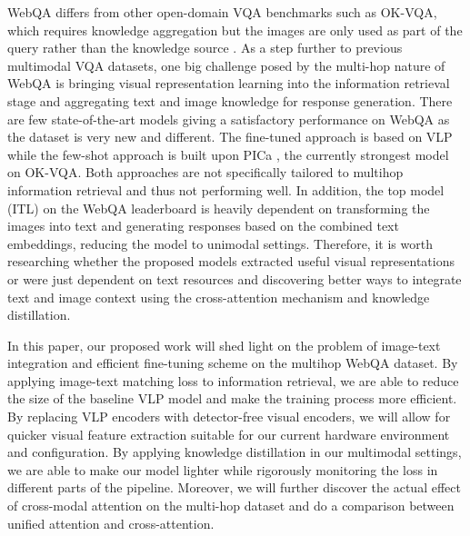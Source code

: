 \documentclass[nohyperref]{article}
\theoremstyle{plain}
\theoremstyle{definition}
\theoremstyle{remark}
\begin{document}
WebQA differs from other open-domain VQA benchmarks such as OK-VQA, which requires knowledge aggregation but the images are only used as part of the query rather than the knowledge source \citep{okvqa}. As a step further to previous multimodal VQA datasets, one big challenge posed by the multi-hop nature of WebQA is bringing visual representation learning into the information retrieval stage and aggregating text and image knowledge for response generation. There are few state-of-the-art models giving a satisfactory performance on WebQA as the dataset is very new and different. The fine-tuned approach is based on VLP while the few-shot approach is built upon PICa \citep{PICa}, the currently strongest model on OK-VQA. Both approaches are not specifically tailored to multihop information retrieval and thus not performing well. In addition, the top model (ITL) on the WebQA leaderboard is heavily dependent on transforming the images into text and generating responses based on the combined text embeddings, reducing the model to unimodal settings. Therefore, it is worth researching whether the proposed models extracted useful visual representations or were just dependent on text resources and discovering better ways to integrate text and image context using the cross-attention mechanism and knowledge distillation. 

In this paper, our proposed work will shed light on the problem of image-text integration and efficient fine-tuning scheme on the multihop WebQA dataset. By applying image-text matching loss to information retrieval, we are able to reduce the size of the baseline VLP model and make the training process more efficient. By replacing VLP encoders with detector-free visual  encoders, we will allow for quicker visual feature extraction suitable for our current hardware environment and configuration. By applying knowledge distillation in our multimodal settings, we are able to make our model lighter while rigorously monitoring the loss in different parts of the pipeline. Moreover, we will further discover the actual effect of cross-modal attention on the multi-hop dataset and do a comparison between unified attention and cross-attention.
\end{document}
